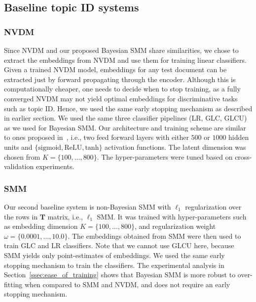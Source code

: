 \documentclass[journal]{IEEEtran}
\newcommand{\mb}[1]{\bm{#1}}
\begin{document}
\subsection{Baseline topic ID systems}
\label{ssec:baselines}
\subsubsection{NVDM}
\label{ssec:nvdm_base}
Since NVDM and our proposed Bayesian
SMM share similarities, we chose to extract the embeddings from NVDM and use
them for training linear classifiers. Given a trained NVDM model, embeddings 
for any test document can be extracted just by forward propagating through 
the encoder. Although this is computationally cheaper, one needs to decide 
when to stop training, as a fully converged NVDM may not yield optimal 
embeddings for discriminative tasks such as topic ID. Hence, we used the same
early stopping mechanism as described in earlier section. We used the same 
three classifier pipelines (LR, GLC, GLCU) as we used for Bayesian SMM. Our 
architecture and training scheme are similar to ones proposed 
in~\cite{NVI:2016}, i.e., two 
feed forward layers with either \(500\) or \(1000\) hidden units and 
\(\{\mathrm{sigmoid}, \mathrm{ReLU}, \mathrm{tanh}\}\) activation functions. 
The latent dimension was chosen from \(K=\{100, \ldots, 800\}\). The 
hyper-parameters were tuned based on cross-validation experiments.

\subsubsection{SMM}
Our second baseline system is non-Bayesian SMM with \(\ell_1\) regularization
over the rows in \(\mb{T}\) matrix, i.e., \(\ell_1\) SMM. It was trained with
hyper-parameters such as embedding dimension \(K=\{100, \ldots, 
800\}\), and regularization weight \(\omega=\{0.0001, \ldots, 10.0\}\). The 
embeddings obtained from SMM were then used to train GLC and LR classifiers. 
Note that we cannot use GLCU here, because SMM yields only point-estimates of
embeddings. We used the same early stopping mechanism to train the classifiers. 
The experimental analysis in Section~\ref{ssec:ease_of_training} shows that 
Bayesian SMM is more robust to over-fitting when compared to SMM and NVDM, 
and does not require an early stopping mechanism.
\end{document}
